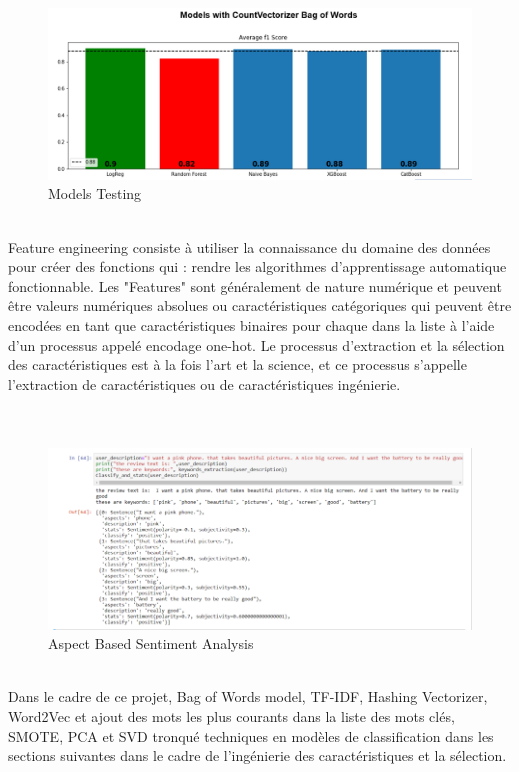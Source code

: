 \\
\begin{figure}[!htb] 
\begin{center} 
\includegraphics[scale=0.5]{pics/screens/11.png}
\end{center} 
\caption{Models Testing} 
\end{figure}  \FloatBarrier
\\


Feature engineering consiste à utiliser la connaissance du domaine des données pour créer des fonctions qui :
rendre les algorithmes d’apprentissage automatique fonctionnable. Les "Features" sont généralement de nature numérique et peuvent être valeurs numériques absolues ou caractéristiques catégoriques qui peuvent être encodées en tant que caractéristiques binaires pour chaque dans la liste à l’aide d’un processus appelé encodage one-hot. Le processus d’extraction et la sélection des caractéristiques est à la fois l’art et la science, et ce processus s’appelle l’extraction de caractéristiques ou de caractéristiques ingénierie.\\

\\

\\
\begin{figure}[!htb] 
\begin{center} 
\includegraphics[width=1\linewidth]{pics/screens/10.png}
\end{center} 
\caption{Aspect Based Sentiment Analysis} 
\end{figure}  \FloatBarrier
\\
Dans le cadre de ce projet, Bag of Words model, TF-IDF, Hashing Vectorizer, Word2Vec et ajout des mots les plus courants dans la liste des mots clés, SMOTE, PCA et SVD tronqué techniques en modèles de classification dans les sections suivantes dans le cadre de l’ingénierie des caractéristiques et la sélection. \\



